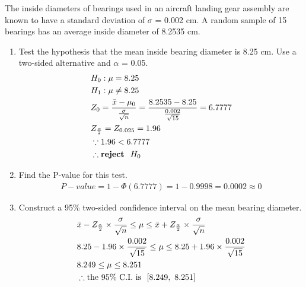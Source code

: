 The inside diameters of bearings used in an aircraft landing gear assembly are known to have a standard deviation of $\sigma$ = 0.002 cm. A random sample of 15 bearings has an average inside diameter of 8.2535 cm.

\begin{enumerate}
    \item Test the hypothesis that the mean inside bearing diameter is 8.25 cm. Use a two-sided alternative and $\alpha$ = 0.05.
        \begin{align*}
            &H_0: \mu = 8.25 \\
            &H_1: \mu \neq 8.25 \\
            &Z_0 = \frac{\Bar{x} - \mu_0}{\frac{\sigma}{\sqrt{n}}} = \frac{8.2535 - 8.25}{\frac{0.002}{\sqrt{15}}} = 6.7777 \\
            &Z_\frac{\alpha}{2} = Z_{0.025} = 1.96 \\
            &\because 1.96 < 6.7777\\
            &\therefore \textbf{reject } \ H_0
        \end{align*}

    \item Find the P-value for this test.
        \begin{align*}
            P-value = 1 - \Phi(6.7777) 
            = 1 - 0.9998
            = 0.0002
            \approx 0
        \end{align*}

    \item Construct a 95\% two-sided confidence interval on the mean bearing diameter.
        \begin{align*}
            &\Bar{x} - Z_\frac{\alpha}{2} \times \frac{\sigma}{\sqrt{n}} \leq \mu \leq \Bar{x} + Z_\frac{\alpha}{2} \times \frac{\sigma}{\sqrt{n}}\\
            &8.25 - 1.96 \times \frac{0.002}{\sqrt{15}} \leq \mu \leq 8.25 + 1.96 \times \frac{0.002}{\sqrt{15}} \\
            &8.249 \leq \mu \leq 8.251\\
            &\therefore \text{the 95\% C.I. is } \ [8.249, \ 8.251]
        \end{align*}
    
\end{enumerate}

\pagebreak
